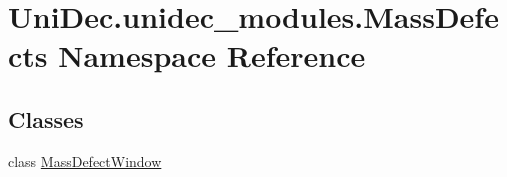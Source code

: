 \hypertarget{namespace_uni_dec_1_1unidec__modules_1_1_mass_defects}{}\section{Uni\+Dec.\+unidec\+\_\+modules.\+Mass\+Defects Namespace Reference}
\label{namespace_uni_dec_1_1unidec__modules_1_1_mass_defects}
\subsection*{Classes}
\begin{DoxyCompactItemize}
\item 
class \hyperlink{class_uni_dec_1_1unidec__modules_1_1_mass_defects_1_1_mass_defect_window}{Mass\+Defect\+Window}
\end{DoxyCompactItemize}

